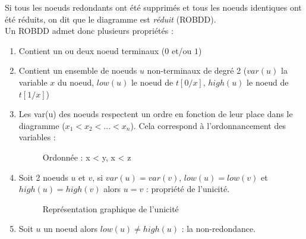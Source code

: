 \documentclass[a4paper, oneside]{report}
\begin{document}
\noindent Si tous les noeuds redondants ont été supprimés et tous les noeuds identiques ont été réduits, on dit que le diagramme est \textit{réduit} (ROBDD).\\

\noindent Un ROBDD admet donc plusieurs propriétés :
\begin{enumerate}
\item Contient un ou deux noeud terminaux ($0$ et/ou $1$)
\item Contient un ensemble de noeuds $u$ non-terminaux de degré 2 ($var(u)$ la variable $x$ du noeud, $low(u)$ le noeud de $t[0/x]$, $high(u)$ le noeud de $t[1/x]$)
\item Les var(u) des noeuds respectent un ordre en fonction de leur place dans le diagramme ($x_1 < x_2 < ... < x_n$). Cela correspond à l'ordonnancement des variables :
\begin{figure}[h]
\centering
\caption{Ordonnée : x < y, x < z}
\end{figure}
\newpage
\item Soit 2 noeuds $u$ et $v$, si $var(u) = var(v)$, $low(u) = low(v)$ et $high(u) = high(v)$ alors $u = v$ : propriété de l'unicité.
\begin{figure}[h]
\centering
{}
\caption{Représentation graphique de l'unicité}
\end{figure}
\item Soit $u$ un noeud alors $low(u) \neq high(u)$ : la non-redondance.
\begin{figure}[h]
\centering
\end{figure}
\end{enumerate}
\end{document}

